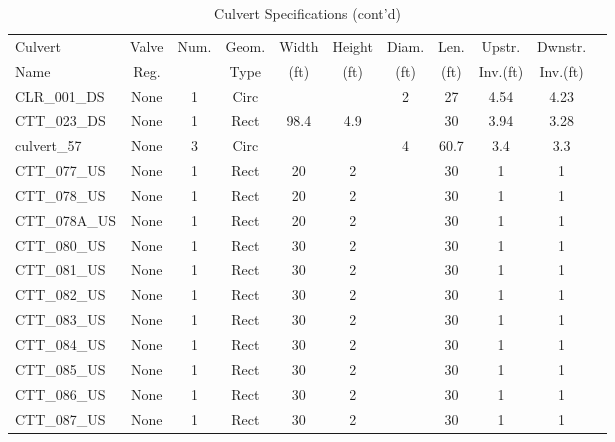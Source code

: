 \begin{table}[]
\caption{Culvert Specifications (cont'd)}
\label{tab:culv-specs3}
\begin{tabular}{@{}lcccccccccc@{}}
\toprule
Culvert       & Valve      & Num.     & Geom.& Width  & Height & Diam.    & Len.   & Upstr.    & Dwnstr.    \\
Name          & Reg.       &          & Type & (ft)   & (ft)   & (ft)     & (ft)   & Inv.(ft)  & Inv.(ft)   \\
\midrule
CLR\_001\_DS  & None       & 1        & Circ &        &       & 2        & 27     & 4.54      & 4.23       \\
CTT\_023\_DS  & None       & 1        & Rect & 98.4   & 4.9   &          & 30     & 3.94      & 3.28       \\
culvert\_57   & None       & 3        & Circ &        &       & 4        & 60.7   & 3.4       & 3.3        \\
CTT\_077\_US  & None       & 1        & Rect & 20     & 2     &          & 30     & 1         & 1          \\
CTT\_078\_US  & None       & 1        & Rect & 20     & 2     &          & 30     & 1         & 1          \\
CTT\_078A\_US & None       & 1        & Rect & 20     & 2     &          & 30     & 1         & 1          \\
CTT\_080\_US  & None       & 1        & Rect & 30     & 2     &          & 30     & 1         & 1          \\
CTT\_081\_US  & None       & 1        & Rect & 30     & 2     &          & 30     & 1         & 1          \\
CTT\_082\_US  & None       & 1        & Rect & 30     & 2     &          & 30     & 1         & 1          \\
CTT\_083\_US  & None       & 1        & Rect & 30     & 2     &          & 30     & 1         & 1          \\
CTT\_084\_US  & None       & 1        & Rect & 30     & 2     &          & 30     & 1         & 1          \\
CTT\_085\_US  & None       & 1        & Rect & 30     & 2     &          & 30     & 1         & 1          \\
CTT\_086\_US  & None       & 1        & Rect & 30     & 2     &          & 30     & 1         & 1          \\
CTT\_087\_US  & None       & 1        & Rect & 30     & 2     &          & 30     & 1         & 1          \\

\end{tabular}
\end{table}
